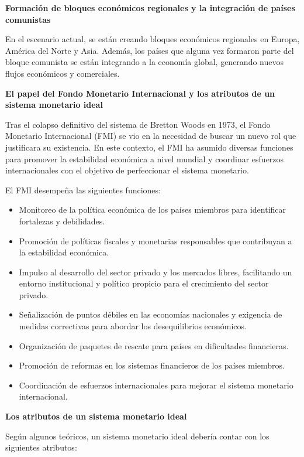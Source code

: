 \documentclass[
  a4paper,
]{article}
\begin{document}
\textbf{Formación de bloques económicos regionales y la integración de
países comunistas}

En el escenario actual, se están creando bloques económicos regionales
en Europa, América del Norte y Asia. Además, los países que alguna vez
formaron parte del bloque comunista se están integrando a la economía
global, generando nuevos flujos económicos y comerciales.

\textbf{El papel del Fondo Monetario Internacional y los atributos de un
sistema monetario ideal}

Tras el colapso definitivo del sistema de Bretton Woods en 1973, el
Fondo Monetario Internacional (FMI) se vio en la necesidad de buscar un
nuevo rol que justificara su existencia. En este contexto, el FMI ha
asumido diversas funciones para promover la estabilidad económica a
nivel mundial y coordinar esfuerzos internacionales con el objetivo de
perfeccionar el sistema monetario.

El FMI desempeña las siguientes funciones:

\begin{itemize}
\item
  Monitoreo de la política económica de los países miembros para
  identificar fortalezas y debilidades.
\item
  Promoción de políticas fiscales y monetarias responsables que
  contribuyan a la estabilidad económica.
\item
  Impulso al desarrollo del sector privado y los mercados libres,
  facilitando un entorno institucional y político propicio para el
  crecimiento del sector privado.
\item
  Señalización de puntos débiles en las economías nacionales y exigencia
  de medidas correctivas para abordar los desequilibrios económicos.
\item
  Organización de paquetes de rescate para países en dificultades
  financieras.
\item
  Promoción de reformas en los sistemas financieros de los países
  miembros.
\item
  Coordinación de esfuerzos internacionales para mejorar el sistema
  monetario internacional.
\end{itemize}

\textbf{Los atributos de un sistema monetario ideal}

Según algunos teóricos, un sistema monetario ideal debería contar con
los siguientes atributos:
\end{document}
